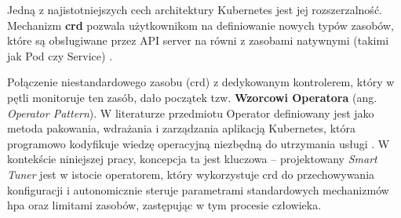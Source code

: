 Jedną z najistotniejszych cech architektury Kubernetes jest jej rozszerzalność. Mechanizm \textbf{\gls{crd}} pozwala użytkownikom na definiowanie nowych typów zasobów, które są obsługiwane przez API server na równi z zasobami natywnymi (takimi jak Pod czy Service) \cite{kubernetes_crd}.

Połączenie niestandardowego zasobu (\gls{crd}) z dedykowanym kontrolerem, który w pętli monitoruje ten zasób, dało początek tzw. \textbf{Wzorcowi Operatora} (ang. \textit{Operator Pattern}). W literaturze przedmiotu Operator definiowany jest jako metoda pakowania, wdrażania i zarządzania aplikacją Kubernetes, która programowo kodyfikuje wiedzę operacyjną niezbędną do utrzymania usługi \cite{dobies2020operators}.
W kontekście niniejszej pracy, koncepcja ta jest kluczowa – projektowany \textit{Smart Tuner} jest w istocie operatorem, który wykorzystuje \gls{crd} do przechowywania konfiguracji i autonomicznie steruje parametrami standardowych mechanizmów \gls{hpa} oraz limitami zasobów, zastępując w tym procesie człowieka.

